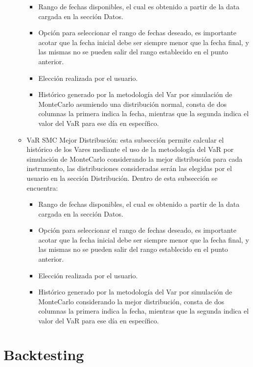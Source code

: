 \documentclass[
  12pt,
]{krantz}
\providecommand{\tightlist}{%
  \setlength{\itemsep}{0pt}\setlength{\parskip}{0pt}}
\begin{document}
\begin{itemize}
\begin{itemize}
    \begin{itemize}
    \tightlist
    \item
      Rango de fechas disponibles, el cual es obtenido a partir de la data cargada en la sección Datos.
    \item
      Opción para seleccionar el rango de fechas deseado, es importante acotar que la fecha inicial debe ser siempre menor que la fecha final, y las mismas no se pueden salir del rango establecido en el punto anterior.
    \item
      Elección realizada por el usuario.
    \item
      Histórico generado por la metodología del Var por simulación de MonteCarlo asumiendo una distribución normal, consta de dos columnas la primera indica la fecha, mientras que la segunda indica el valor del VaR para ese día en específico.
    \end{itemize}
  \item
    VaR SMC Mejor Distribución: esta subsección permite calcular el histórico de los Vares mediante el uso de la metodología del VaR por simulación de MonteCarlo considerando la mejor distribución para cada instrumento, las distribuciones consideradas serán las elegidas por el usuario en la sección Distribución. Dentro de esta subsección se encuentra:

    \begin{itemize}
    \tightlist
    \item
      Rango de fechas disponibles, el cual es obtenido a partir de la data cargada en la sección Datos.
    \item
      Opción para seleccionar el rango de fechas deseado, es importante acotar que la fecha inicial debe ser siempre menor que la fecha final, y las mismas no se pueden salir del rango establecido en el punto anterior.
    \item
      Elección realizada por el usuario.
    \item
      Histórico generado por la metodología del Var por simulación de MonteCarlo considerando la mejor distribución, consta de dos columnas la primera indica la fecha, mientras que la segunda indica el valor del VaR para ese día en específico.
    \end{itemize}
  \end{itemize}
\end{itemize}

\hypertarget{backtesting-1}{%
\section{Backtesting}\label{backtesting-1}}
\end{document}
